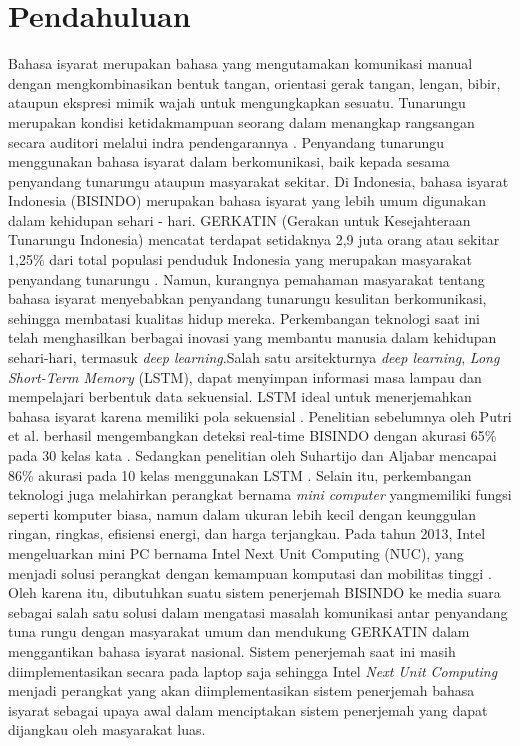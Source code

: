 \section{Pendahuluan}
\label{sec:pendahuluan}


Bahasa isyarat merupakan bahasa yang mengutamakan komunikasi manual dengan mengkombinasikan bentuk tangan, orientasi gerak tangan, lengan, bibir, ataupun ekspresi mimik wajah untuk mengungkapkan sesuatu. Tunarungu merupakan kondisi ketidakmampuan seorang dalam menangkap rangsangan secara auditori melalui indra pendengarannya \cite{maulida2017}. Penyandang tunarungu menggunakan bahasa isyarat dalam berkomunikasi, baik kepada sesama penyandang tunarungu ataupun masyarakat sekitar. Di Indonesia, bahasa isyarat Indonesia (BISINDO) merupakan bahasa isyarat yang lebih umum digunakan dalam kehidupan sehari - hari. GERKATIN (Gerakan untuk Kesejahteraan Tunarungu Indonesia) mencatat terdapat setidaknya 2,9 juta orang atau sekitar 1,25\% dari total populasi penduduk Indonesia yang merupakan masyarakat penyandang tunarungu \cite{evitasari2015}. Namun, kurangnya pemahaman masyarakat tentang bahasa isyarat menyebabkan penyandang tunarungu kesulitan berkomunikasi, sehingga membatasi kualitas hidup mereka. Perkembangan teknologi saat ini telah menghasilkan berbagai inovasi yang membantu manusia dalam kehidupan sehari-hari, termasuk \emph{deep learning}.Salah satu arsitekturnya \emph{deep learning}, \emph{Long Short-Term Memory} (LSTM), dapat menyimpan informasi masa lampau dan mempelajari berbentuk data sekuensial. LSTM ideal untuk menerjemahkan bahasa isyarat karena memiliki pola sekuensial \cite{sadli2020}. Penelitian sebelumnya oleh Putri et al. berhasil mengembangkan deteksi real-time BISINDO dengan akurasi 65\% pada 30 kelas kata \cite{putri2022}. Sedangkan penelitian oleh Suhartijo dan Aljabar mencapai 86\% akurasi pada 10 kelas menggunakan LSTM \cite{aljabar2020}. Selain itu, perkembangan teknologi juga melahirkan perangkat bernama \emph{mini computer} yangmemiliki fungsi seperti komputer biasa, namun dalam ukuran lebih kecil dengan keunggulan ringan, ringkas, efisiensi energi, dan harga terjangkau. Pada tahun 2013, Intel mengeluarkan mini PC bernama Intel Next Unit Computing (NUC), yang menjadi solusi perangkat dengan kemampuan komputasi dan mobilitas tinggi \cite{minny2023}. Oleh karena itu, dibutuhkan suatu sistem penerjemah BISINDO ke media suara sebagai salah satu solusi dalam mengatasi masalah komunikasi antar penyandang tuna rungu dengan masyarakat umum dan mendukung GERKATIN dalam menggantikan bahasa isyarat nasional. Sistem penerjemah saat ini masih diimplementasikan secara pada laptop saja sehingga Intel \emph{Next Unit Computing} menjadi perangkat yang akan diimplementasikan sistem penerjemah bahasa isyarat sebagai upaya awal dalam menciptakan sistem penerjemah yang dapat dijangkau oleh masyarakat luas.